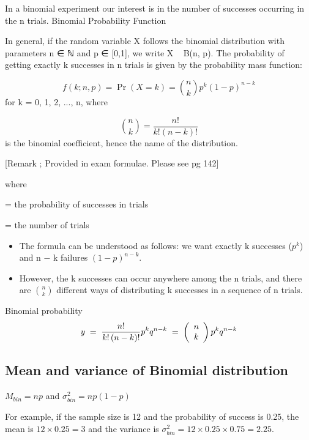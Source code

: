 	
	In a binomial experiment our interest is in the number of successes occurring in the n trials.
	Binomial Probability Function
	
	In general, if the random variable X follows the binomial distribution with parameters n ∈ ℕ and p ∈ [0,1], we write X ~ B(n, p). The probability of getting exactly k successes in n trials is given by the probability mass function:
	
\[	f(k;n,p)=\Pr(X=k)={\binom {n}{k}}p^{k}(1-p)^{n-k}\]
	for k = 0, 1, 2, ..., n, where
	
\[	{\binom {n}{k}}={\frac {n!}{k!(n-k)!}}\]
	is the binomial coefficient, hence the name of the distribution. 
	
	[Remark ; Provided in exam formulae. Please see pg 142]
	
	
	
	where
	
	= the probability of   successes in   trials
	
	= the number of trials
	
	\begin{itemize}
		\item The formula can be understood as follows: we want exactly k successes ($p^k$) and n − k failures $(1 − p)^{n − k}$.
		\item However, the k successes can occur anywhere among the n trials, and there are ${n \choose k}$ different ways of distributing k successes in a sequence of n trials.
	\end{itemize}
	
Binomial probability
	\[y \;=\; \frac{{n!}}{{k!\left( {n - k} \right)!}}p^k q^{n - k} \; = \; \left( {\begin{array}{*{20}c} n \\ k \\ \end{array}} \right)p^k q^{n -
		k}\]
	
\subsection{Mean and variance of Binomial distribution}
	
	$M_{bin} = np$  and $\sigma ^2 _{bin} = np(1-p)$
	
	For example, if the sample size is 12 and the probability of
	success is 0.25, the mean is $12 \times 0.25 = 3$ and the variance
	is $\sigma ^2 _{bin} = 12 \times 0.25 \times 0.75 = 2.25$.
	
	
